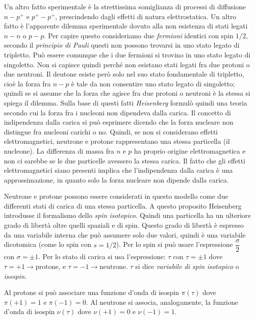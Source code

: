 Un altro fatto sperimentale è la strettissima somiglianza di processi di
diffusione $n-p^{+}$ e $p^{+}-p^{+}$, prescindendo dagli effetti di natura
elettrostatica. Un altro fatto è l'apparente dilemma  sperimentale dovuto alla
non esistenza di stati legati $n-n$ o $p-p$.
Per capire questo consideriamo due \textit{fermioni} identici con spin $1/2$,
secondo il \textit{principio di Pauli} questi non possono trovarsi in uno stato
legato di tripletto. Può essere comunque che i due fermioni si trovino in uno
stato legato di singoletto. Non si capisce quindi perché non esistano stati
legati fra due protoni o due neutroni. Il deutone esiste però solo nel suo 
stato
fondamentale di tripletto, cioè la forza fra $n-p$ è tale da non consentire 
uno
stato legato di singoletto; quindi se si assume che la forza che agisce fra due
protoni o neutroni è la stessa si spiega il dilemma.
Sulla base di questi fatti \textit{Heisenberg} formulò quindi una teoria 
secondo
cui la forza fra i nucleoni non dipendeva dalla carica.
Il concetto di indipendenza dalla carica si può esprimere dicendo che la forza
nucleare non distingue fra nucleoni carichi o no. Quindi, se non si considerano
effetti elettromagnetici, neutrone e protone rappresentano una stessa particella
(il nucleone). La differenza di massa fra $n$ e $p$ ha proprio origine
elettromagnetica e non ci sarebbe se le due particelle avessero la stessa
carica. Il fatto che gli effetti elettromagnetici siano presenti implica che
l'indipendenza dalla carica è una approssimazione, in quanto solo la forza
nucleare non dipende dalla carica.

Neutrone e protone possono essere considerati in questo modello come due
differenti stati di carica di una stessa particella. A questo proposito
Heisenberg introdusse il formalismo dello \textit{spin isotopico}.
Quindi una particella ha un ulteriore grado di libertà oltre quelli spaziali e
di spin. Questo grado di libertà è espresso da una variabile interna che può
assumere solo due valori, quindi è una variabile dicotomica (come lo spin con
$s=1/2$). Per lo spin si può usare l'espressione $\dfrac{\sigma}{2}$ con
$\sigma=\pm 1$. Per lo stato di carica si usa l'espressione: $\tau$ con $\tau =
\pm 1$ dove $\tau= +1 \rightarrow \text{protone}$, e $\tau= -1 \rightarrow
\text{neutrone}$.
 $\tau$ si dice \textit{variabile di spin isotopico} o  \textit{isospin}.

Al protone si può associare una funzione d'onda di isospin $\pi(\tau)$ dove
$\pi(+1) = 1$ e $\pi(-1) = 0$. Al neutrone si associa, analogamente, la funzione
d'onda di isospin $\nu(\tau)$ dove $\nu(+1) = 0$ e $\nu(-1) = 1$.

